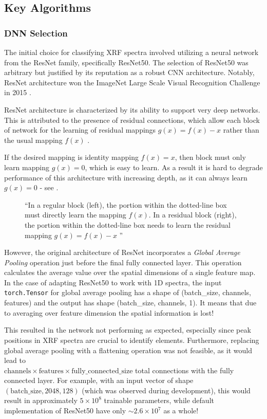 \subsection{Key Algorithms}
\subsubsection{DNN Selection}

The initial choice for classifying XRF spectra involved utilizing a neural network from the ResNet family, specifically ResNet50. The selection of ResNet50 was arbitrary but justified by its reputation as a robust CNN architecture. Notably, ResNet architecture won the ImageNet Large Scale Visual Recognition Challenge in 2015 \cite{ImageNet2015}.

ResNet architecture is characterized by its ability to support very deep networks. This is attributed to the presence of residual connections, which allow each block of network for the learning of residual mappings $g(x) = f(x) - x$ rather than the usual mapping $f(x)$ \cite{d2lResnet}. 

If the desired mapping is identity mapping $f(x) = x$, then block must only learn mapping $g(x) = 0$, which is easy to learn. 
As a result it is hard to degrade performance of this architecture with increasing depth, as it can always learn $g(x) = 0$ - see .

\begin{figure}[h] 
  \centering     
   
  \caption{``In a regular block (left), the portion within the dotted-line box must directly learn the mapping $f(x)$. 
  In a residual block (right), the portion within the dotted-line box needs to learn the residual mapping $g(x) = f(x) - x$ \cite{d2lResnet}''}
  \label{fig:residual-block}
\end{figure}

However, the original architecture of ResNet incorporates a \emph{Global Average Pooling} operation just before the final fully connected layer. 
This operation calculates the average value over the spatial dimensions of a single feature map. 
In the case of adapting ResNet50 to work with 1D spectra, the input \texttt{torch.Tensor} for global average pooling has a shape of (batch\_size, channels, features) and the output has shape (batch\_size, channels, 1). 
It means that due to averaging over feature dimension the spatial information is lost!

This resulted in the network not performing as expected, especially since peak positions in XRF spectra are crucial to identify elements. 
Furthermore, replacing global average pooling with a flattening operation was not feasible, as it would lead to \\ $\text{{channels}} \times \text{{features}} \times \text{{fully\_connected\_size}}$ total connections with the fully connected layer. 
For example, with an input vector of shape $(\text{{batch\_size}}, 2048, 128)$ (which was observed during development), this would result in approximately $5 \times 10^{8}$ trainable parameters, while default implementation of ResNet50 have only $\sim2.6 \times 10^7$ as a whole!

